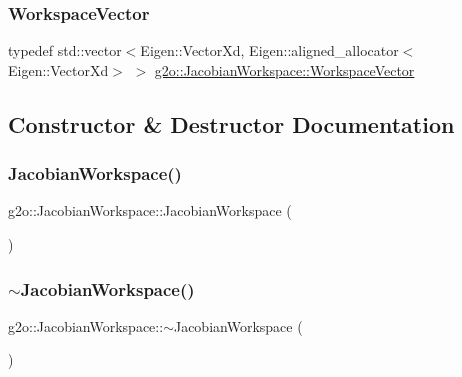 \subsubsection{\texorpdfstring{Workspace\+Vector}{WorkspaceVector}}
{\footnotesize\ttfamily typedef std\+::vector$<$Eigen\+::\+Vector\+Xd, Eigen\+::aligned\+\_\+allocator$<$Eigen\+::\+Vector\+Xd$>$ $>$ \mbox{\hyperlink{classg2o_1_1_jacobian_workspace_aee9d767fa1208772a3de83732646e182}{g2o\+::\+Jacobian\+Workspace\+::\+Workspace\+Vector}}}



\subsection{Constructor \& Destructor Documentation}
\mbox{\label{classg2o_1_1_jacobian_workspace_a6c20de27401a40e620ee065c80d24b9e}} 
\subsubsection{\texorpdfstring{Jacobian\+Workspace()}{JacobianWorkspace()}}
{\footnotesize\ttfamily g2o\+::\+Jacobian\+Workspace\+::\+Jacobian\+Workspace (\begin{DoxyParamCaption}{ }\end{DoxyParamCaption})}

\mbox{\label{classg2o_1_1_jacobian_workspace_a0d00e42f6e048268ff5005b8e3f578dd}} 
\subsubsection{\texorpdfstring{$\sim$\+Jacobian\+Workspace()}{~JacobianWorkspace()}}
{\footnotesize\ttfamily g2o\+::\+Jacobian\+Workspace\+::$\sim$\+Jacobian\+Workspace (\begin{DoxyParamCaption}{ }\end{DoxyParamCaption})}



